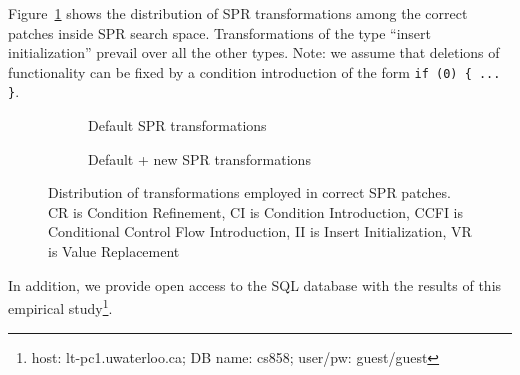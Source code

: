 Figure~\ref{figure:transforms-old} shows the distribution of SPR transformations among the correct patches inside SPR search space. Transformations of the type ``insert initialization'' prevail over all the other types.
Note: we assume that deletions of functionality can be fixed by a condition introduction of the form \texttt{if~(0)~\{ ... \}}.

\begin{figure}
\begin{subfigure}[b]{.48\linewidth}
    \small \caption{Default SPR transformations}
    \label{figure:transforms-old}
\end{subfigure}
\hfill
\begin{subfigure}[b]{.48\linewidth}
    \small \caption{Default + new SPR transformations}
    \label{figure:transforms-new}
\end{subfigure}

    \small \caption{Distribution of transformations employed in correct SPR patches. CR is Condition Refinement, CI is Condition Introduction, CCFI is Conditional Control Flow Introduction, II is Insert Initialization, VR is Value Replacement}
        \label{figure:transforms}
    \vspace{-0.2in}
\end{figure}

In addition, we provide open access to the SQL database with the results of this empirical study\footnote{host: lt-pc1.uwaterloo.ca; DB name: cs858; user/pw: guest/guest}.
